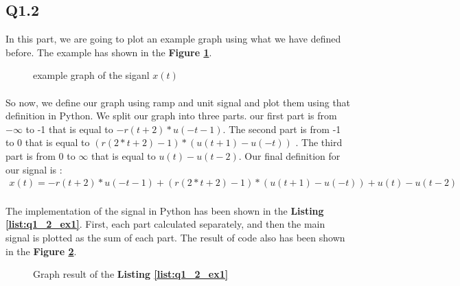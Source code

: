 \subsection{Q1.2}

In this part, we are going to plot an example 
graph using what we have defined before. The example has 
shown in the \textbf{Figure \ref{fig:ex1}}.

\begin{figure}[H]
 \centering
{}
\caption{example graph of the siganl $x(t)$}
  \label{fig:ex1}
\end{figure}

\paragraph{}So now, we define our graph using ramp and unit 
signal and plot them using that definition in Python. We 
split our graph into three parts. our first part is from 
$-\infty$ to -1 that is equal to $-r(t+2) * u(-t-1)$. The 
second part is from -1 to 0 that is equal to $(r(2*t+2)-1) *(u(t+1)-u(-t))$
. The third part is from 0 to $\infty$ that is equal to 
$u(t) -u(t-2)$. Our final definition for our signal is :
\begin{align}
  x(t) = -r(t+2) * u(-t-1) + (r(2*t+2)-1) *(u(t+1)-u(-t)) + u(t) -u(t-2)
 \end{align}
 \paragraph{}The implementation of the signal in Python
  has been shown in the \textbf{Listing \ref{list:q1_2_ex1}}. First, each 
  part calculated separately, and then the main signal 
  is plotted as the sum of each part. The result of code 
  also has been shown in the \textbf{Figure \ref{fig:Q1-2-ex1}}.



\begin{figure}[H]
  \centering
  \scalebox{0.4}{}
  \caption{Graph result of the \textbf{Listing \ref{list:q1_2_ex1}}}
  \label{fig:Q1-2-ex1}
\end{figure}

